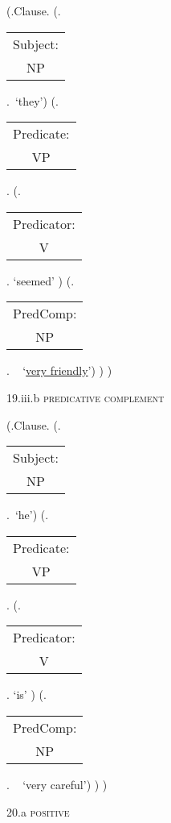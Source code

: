 \documentclass[12pt,letterpaper]{article}
\begin{document}
\begin{figure}
	\begin{center}
		\begin{parsetree}
			(.Clause.
			(.\begin{tabular}{c}Subject:\\NP\end{tabular}.~`they')
			(.\begin{tabular}{c}Predicate:\\VP\end{tabular}.
			(.\begin{tabular}{c}Predicator:\\V\end{tabular}. `seemed' )
			(.\begin{tabular}{c}PredComp:\\NP\end{tabular}.  ~ `\underline{very friendly}')
			)
			)
			
			\hfill \break\hfill \break
		\end{parsetree}
		19.iii.b \textsc{predicative complement}
	\end{center}
\end{figure}

\clearpage
\begin{figure}
	\begin{center}
		\begin{parsetree}
			(.Clause.
			(.\begin{tabular}{c}Subject:\\NP\end{tabular}.~`he')
			(.\begin{tabular}{c}Predicate:\\VP\end{tabular}.
			(.\begin{tabular}{c}Predicator:\\V\end{tabular}. `is' )
			(.\begin{tabular}{c}PredComp:\\NP\end{tabular}.  ~ `very careful')
			)
			)
			
			\hfill \break\hfill \break
		\end{parsetree}
		20.a \textsc{positive}
	\end{center}
\end{figure}
\end{document}
